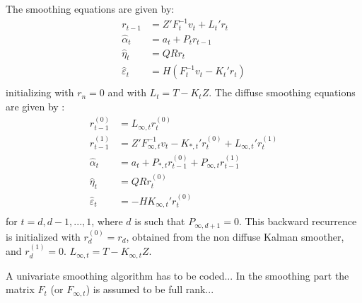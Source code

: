 \documentclass{amsart}
\theoremstyle{definition}
\theoremstyle{remark}
\numberwithin{equation}{section}
\begin{document}
\noindent The smoothing equations are given by:
\begin{equation}
\begin{split}
r_{t-1} &= Z' F_t^{-1}v_t + L_t' r_t\\
\widehat{\alpha}_t &= a_t + P_t r_{t-1} \\
\widehat{\eta}_t &= Q R r_t\\
\widehat{\varepsilon}_t &= H \left(F_t^{-1}v_t-K_t'r_t\right)\\
\end{split}
\end{equation}
initializing with $r_n = 0$ and with $L_t = T-K_tZ$. The diffuse
smoothing equations are given by :
\begin{equation}
\begin{split}
r_{t-1}^{(0)} &= L_{\infty,t}r_{t}^{(0)}\\
r_{t-1}^{(1)} &= Z' F_{\infty,t}^{-1}v_t - K_{\ast,t}'r_{t}^{(0)}+ L_{\infty,t}' r_t^{(1)}\\
\widehat{\alpha}_t &= a_t + P_{\ast,t} r_{t-1}^{(0)} + P_{\infty,t}r_{t-1}^{(1)}\\
\widehat{\eta}_t &= Q R r_t^{(0)}\\
\widehat{\varepsilon}_t &= -H K_{\infty,t}'r_t^{(0)}\\
\end{split}
\end{equation}
for $t = d,d-1,...,1$, where $d$ is such that $P_{\infty,d+1}=0$.
This backward recurrence is initialized with $r_{d}^{(0)}=r_{d}$,
obtained from the non diffuse Kalman smoother, and
$r_{d}^{(1)}=0$. $L_{\infty,t} = T-K_{\infty,t}Z$.\newline


\noindent A univariate smoothing algorithm has to be coded... In
the smoothing part the matrix $F_t$ (or $F_{\infty,t}$) is assumed
to be full rank...





%
%
\end{document}
